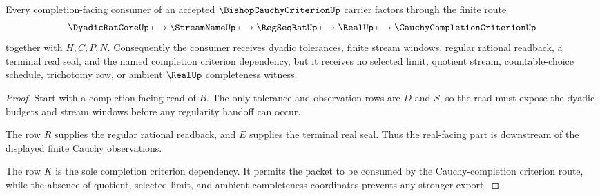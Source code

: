 \begin{theorem}
\label{thm:bishop-cauchy-criterion-completion-route}
Every completion-facing consumer of an accepted $\BishopCauchyCriterionUp$ carrier factors through the finite route
$$
\DyadicRatCoreUp \longmapsto \StreamNameUp \longmapsto \RegSeqRatUp \longmapsto \RealUp \longmapsto \CauchyCompletionCriterionUp
$$
together with $H,C,P,N$. Consequently the consumer receives dyadic tolerances, finite stream windows, regular rational readback, a terminal real seal, and the named completion criterion dependency, but it receives no selected limit, quotient stream, countable-choice schedule, trichotomy row, or ambient $\RealUp$ completeness witness.
\end{theorem}
\begin{proof}
Start with a completion-facing read of $B$. The only tolerance and observation rows are $D$ and $S$, so the read must expose the dyadic budgets and stream windows before any regularity handoff can occur.

The row $R$ supplies the regular rational readback, and $E$ supplies the terminal real seal. Thus the real-facing part is downstream of the displayed finite Cauchy observations.

The row $K$ is the sole completion criterion dependency. It permits the packet to be consumed by the Cauchy-completion criterion route, while the absence of quotient, selected-limit, and ambient-completeness coordinates prevents any stronger export.
\end{proof}


\begin{closurestatus}{\BishopCauchyCriterionUp}
  \theoryclosure{\scopedClosure}
  \formalstatus{\theoremCheckedV}
\end{closurestatus}
